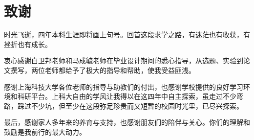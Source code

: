 \chapter[致谢]{致\quad 谢}
\thispagestyle{noheaderstyle}

时光飞逝，四年本科生涯即将画上句号。回首这段求学之路，有迷茫也有收获，有挫折也有成长。

衷心感谢白卫邦老师和马成毓老师在毕业设计期间的悉心指导，从选题、实验到论文撰写，两位老师都给予了极大的指导和帮助，使我受益匪浅。

感谢上海科技大学各位老师的指导与助教们的付出，也感谢学校提供的良好学习环境和科研平台。上科大自由的学风让我得以在这四年中自主探索，虽走过不少弯路，踩过不少坑，但至少在这段弥足珍贵而又短暂的校园时光里，已尽兴探索。

最后，感谢家人多年来的养育与支持，也感谢朋友们的陪伴与关心。你们的理解和鼓励是我前行的最大动力。

\cleardoublepage[plain]
